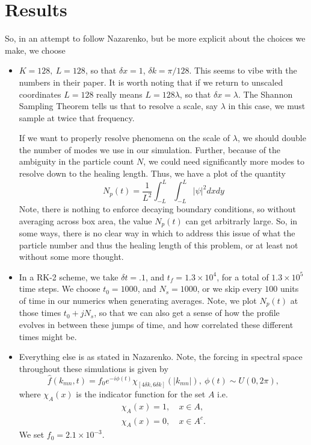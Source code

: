 \documentclass[a4paper,11pt]{article}
\begin{document}
\section*{Results}
So, in an attempt to follow Nazarenko, but be more explicit about the choices we make, we choose 
\begin{itemize}
\item $K = 128, ~ L = 128$, so that $\delta x = 1$, $\delta k = \pi/128$.  This seems to vibe with the numbers in their paper.  It is worth noting that if we return to unscaled coordinates $L=128$ really means $L=128\lambda$, so that $\delta x = \lambda$.  The Shannon Sampling Theorem tells us that to resolve a scale, say $\lambda$ in this case, we must sample at twice that frequency.  

If we want to properly resolve phenomena on the scale of $\lambda$, we should double the number of modes we use in our simulation.  Further, because of the ambiguity in the particle count $N$, we could need significantly more modes to resolve down to the healing length.  Thus, we have a plot of the quantity
\[
N_{p}(t) = \frac{1}{L^{2}}\int_{-L}^{L}\int_{-L}^{L} \left|\psi \right|^{2} dx dy
\]
Note, there is nothing to enforce decaying boundary conditions, so without averaging across box area, the value $N_{p}(t)$ can get arbitrarly large.  So, in some ways, there is no clear way in which to address this issue of what the particle number and thus the healing length of this problem, or at least not without some more thought.  

\item In a RK-2 scheme, we take $\delta t = .1$, and $t_{f}=1.3\times 10^{4}$, for a total of $1.3\times 10^{5}$ time steps.  We choose $t_{0}=1000$, and $N_{s}=1000$, or we skip every $100$ units of time in our numerics when generating averages.  Note, we plot $N_{p}(t)$ at those times $t_{0}+jN_{s}$, so that we can also get a sense of how the profile evolves in between these jumps of time, and how correlated these different times might be. 

\item Everything else is as stated in Nazarenko.  Note, the forcing in spectral space throughout these simulations is given by 
\[
\hat{f}(k_{mn},t) = f_{0}e^{-i\phi(t)}\chi_{[4\delta k , 6\delta k]}(|k_{mn}|), ~ \phi(t) \sim U(0,2\pi),
\]
where $\chi_{A}(x)$ is the indicator function for the set $A$ i.e. 
\begin{align*}
\chi_{A}(x)=1, & ~x\in A,\\
\chi_{A}(x)=0, & ~x\in A^{c}.
\end{align*}
We set $f_{0}=2.1\times 10^{-3}$.  
\end{itemize}
\end{document}
